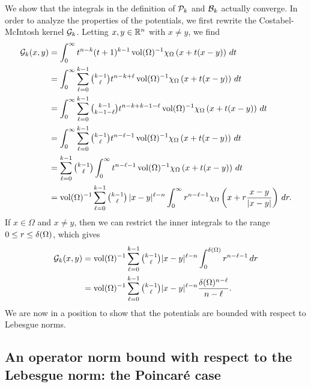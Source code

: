 \documentclass[10pt,a4paper]{article}
\begin{document}
We show that the integrals in the definition of ${\mathcal P}_{k}$ and ${\mathcal B}_{k}$ actually converge. 
In order to analyze the properties of the potentials,
we first rewrite the Costabel-McIntosh kernel ${\mathcal G}_{k}$.
Letting $x,y \in {\mathbb R}^n$ with $x \neq y$, we find 
\begin{align*}
    {\mathcal G}_{k}(x,y) 
    &= 
    \int_{0}^{\infty} t^{n-k} (t+1)^{k-1} \operatorname{vol}(\Omega)^{-1} \chi_{\Omega} \left( x+t(x-y) \right)\,dt
    \\
    &= 
    \int_{0}^{\infty} \sum_{\ell=0}^{k-1} \tbinom{k-1}{\ell} t^{n-k+\ell} \operatorname{vol}(\Omega)^{-1} \chi_{\Omega} \left( x+t(x-y) \right)\,dt
    \\
    &= 
    \int_{0}^{\infty} \sum_{\ell=0}^{k-1} \tbinom{k-1}{k-1-\ell} t^{n-k+k-1-\ell} \operatorname{vol}(\Omega)^{-1} \chi_{\Omega} \left( x+t(x-y) \right)\,dt
    \\
    &= 
    \int_{0}^{\infty} \sum_{\ell=0}^{k-1} \tbinom{k-1}{\ell} t^{n-\ell-1} \operatorname{vol}(\Omega)^{-1} \chi_{\Omega} \left( x+t(x-y) \right)\,dt
    \\
    &= 
    \sum_{\ell=0}^{k-1} \tbinom{k-1}{\ell} \int_{0}^{\infty} t^{n-\ell-1} \operatorname{vol}(\Omega)^{-1} \chi_{\Omega}\left( x+t(x-y) \right)\,dt 
    \\
    &= 
    \operatorname{vol}(\Omega)^{-1} \sum_{\ell=0}^{k-1} \tbinom{k-1}{\ell} \, |x-y|^{\ell-n} \int_{0}^{\infty} r^{n-\ell-1} \chi_{\Omega}\left(x+r\frac{x-y}{|x-y|}\right)\,dr
    .
\end{align*}
If $x \in \Omega$ and $x \neq y$, 
then we can restrict the inner integrals to the range $0 \leq r \leq {\delta}(\Omega)$, which gives 
\begin{align*}
    {\mathcal G}_{k}(x,y) 
    &= 
    \operatorname{vol}(\Omega)^{-1} \sum_{\ell=0}^{k-1}\tbinom{k-1}{\ell} |x-y|^{\ell-n} \int_{0}^{{\delta}(\Omega)} r^{n-\ell-1} \,dr 
    \\
    &= 
    \operatorname{vol}(\Omega)^{-1} \sum_{\ell=0}^{k-1}\tbinom{k-1}{\ell} |x-y|^{\ell-n} \frac{ {\delta}(\Omega)^{n-\ell} }{n-\ell}.
\end{align*}
We are now in a position to show that the potentials are bounded with respect to Lebesgue norms. 



\subsection{An operator norm bound with respect to the Lebesgue norm: the Poincar\'e case}
\end{document}
